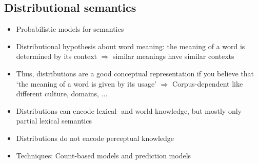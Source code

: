 \subsection{Distributional semantics}
\begin{itemize}
	\item Probabilistic models for semantics
	\item Distributional hypothesis about word meaning: the meaning of a word is determined by its context $\Rightarrow$ similar meanings have similar contexts
	\item Thus, distributions are a good conceptual representation if you believe that ‘the meaning of a word is given by its usage’ $\Rightarrow$ Corpus-dependent like different culture, domains, ...
	\item Distributions can encode lexical- and world knowledge, but mostly only partial lexical semantics
	\item Distributions do not encode perceptual knowledge
	\item Techniques: Count-based models and prediction models
\end{itemize}

